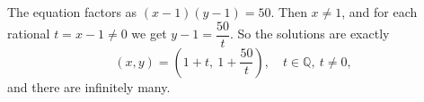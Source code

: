 The equation factors as $(x-1)(y-1)=50$. Then $x\ne1$, and for each rational $t=x-1\ne0$ we get $y-1=\dfrac{50}{t}$. So the solutions are exactly
\[\boxed{(x,y)=\left(1+t,\ 1+\dfrac{50}{t}\right),\quad t\in\mathbb{Q},\ t\ne0},\]
and there are infinitely many.
